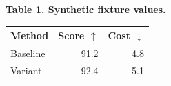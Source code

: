 \small
\noindent\textbf{Table 1. Synthetic fixture values.}\par
\smallskip
\noindent\begin{tabular}{lrr}
\toprule
Method & Score $\uparrow$ & Cost $\downarrow$ \\
\midrule
Baseline & 91.2 & 4.8 \\
Variant & 92.4 & 5.1 \\
\bottomrule
\end{tabular}\par
\medskip
